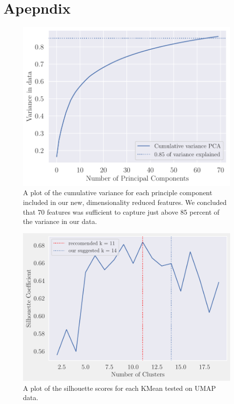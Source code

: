 \section{Apepndix}
\begin{figure}[H]
    \centering
    \includegraphics[width=0.9\linewidth]{examples/tests_eb/figs/cumsum_pca.pdf}
    \caption{A plot of the cumulative variance for each principle component included in our new, dimensionality reduced features. We concluded that 70 features was sufficient to capture just above 85 percent of the variance in our data.}
    \label{fig:cumsumpca}
\end{figure}

\begin{figure}[H]
    \centering
    \includegraphics[width=0.9\linewidth]{examples/tests_eb/figs/kmean_sil.pdf}
    \caption{A plot of the silhouette scores for each KMean tested on UMAP data.}
    \label{fig_cumsumpca}
\end{figure}